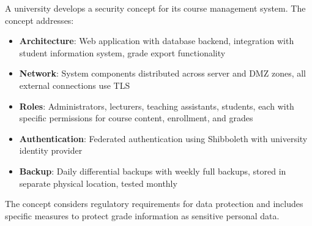 \begin{example}
A university develops a security concept for its course management system. The concept addresses:

\begin{itemize}
    \item \textbf{Architecture}: Web application with database backend, integration with student information system, grade export functionality
    \item \textbf{Network}: System components distributed across server and DMZ zones, all external connections use TLS
    \item \textbf{Roles}: Administrators, lecturers, teaching assistants, students, each with specific permissions for course content, enrollment, and grades
    \item \textbf{Authentication}: Federated authentication using Shibboleth with university identity provider
    \item \textbf{Backup}: Daily differential backups with weekly full backups, stored in separate physical location, tested monthly
\end{itemize}

The concept considers regulatory requirements for data protection and includes specific measures to protect grade information as sensitive personal data.
\end{example}